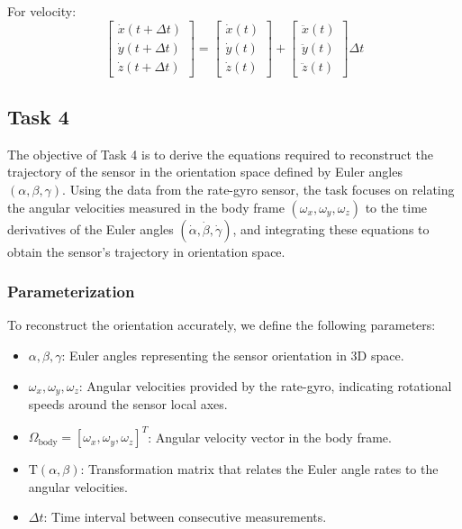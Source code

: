 \documentclass[12pt]{article}
\begin{document}
For velocity:
\[
\begin{bmatrix} \dot{x}(t + \Delta t) \\ \dot{y}(t + \Delta t) \\ \dot{z}(t + \Delta t) \end{bmatrix}
= 
\begin{bmatrix} \dot{x}(t) \\ \dot{y}(t) \\ \dot{z}(t) \end{bmatrix}
+ 
\begin{bmatrix} \ddot{x}(t) \\ \ddot{y}(t) \\ \ddot{z}(t) \end{bmatrix} \Delta t
\]







\subsection{Task 4}

The objective of Task 4 is to derive the equations required to reconstruct the trajectory of the sensor in the orientation space defined by Euler angles \((\alpha, \beta, \gamma)\). Using the data from the rate-gyro sensor, the task focuses on relating the angular velocities measured in the body frame \((\omega_x, \omega_y, \omega_z)\) to the time derivatives of the Euler angles \((\dot{\alpha}, \dot{\beta}, \dot{\gamma})\), and integrating these equations to obtain the sensor's trajectory in orientation space.

\subsubsection{Parameterization}
To reconstruct the orientation accurately, we define the following parameters:
\begin{itemize}
    \item \(\alpha, \beta, \gamma\): Euler angles representing the sensor orientation in 3D space.
    \item \(\omega_x, \omega_y, \omega_z\): Angular velocities provided by the rate-gyro, indicating rotational speeds around the sensor local axes.
    \item \(\Omega_{\text{body}} = [\omega_x, \omega_y, \omega_z]^T\): Angular velocity vector in the body frame.
    \item \(\text{T}(\alpha, \beta)\): Transformation matrix that relates the Euler angle rates to the angular velocities.
    \item \(\Delta t\): Time interval between consecutive measurements.
\end{itemize}
\end{document}
